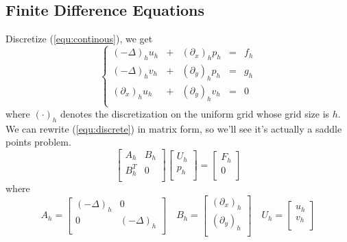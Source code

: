 \subsection{Finite Difference Equations}
Discretize (\ref{equ:continous}), we get
\begin{equation}
    \label{equ:discrete}
    \left\{
    \begin{array}{ccccc}
        (-\Delta)_h u_h &+& (\partial_x)_h p_h &=& f_h\\
        (-\Delta)_h v_h &+& (\partial_y)_h p_h &=& g_h\\
        (\partial_x)_h u_h &+& (\partial_y)_h v_h &=&0\\
    \end{array}
    \right.
\end{equation}
where $(\cdot)_h$ denotes the discretization on the uniform grid
whose grid size is $h$. We can rewrite (\ref{equ:discrete}) in matrix
form, so we'll see it's actually a saddle points problem.
\begin{equation}
    \label{equ:disEqu}
    \begin{bmatrix}
        A_h&B_h\\
        B_h^T&0\\
    \end{bmatrix}
    \begin{bmatrix}
        U_h\\
        p_h\\
    \end{bmatrix}
    =
    \begin{bmatrix}
        F_h\\
        0\\
    \end{bmatrix}
\end{equation}
where
\begin{equation}
    A_h=
    \begin{bmatrix}
        (-\Delta)_h&0\\
        0&(-\Delta)_h\\
    \end{bmatrix}
    \quad
    B_h=
    \begin{bmatrix}
        (\partial_x)_h\\
        (\partial_y)_h\\
    \end{bmatrix}
    \quad
    U_h=
    \begin{bmatrix}
        u_h\\
        v_h\\
    \end{bmatrix}
\end{equation}


